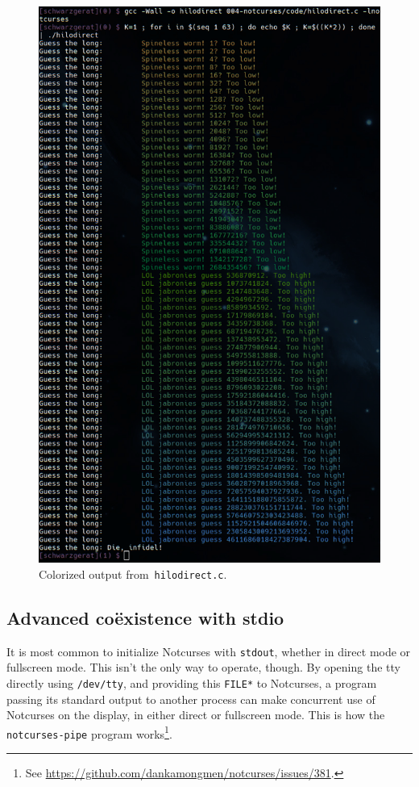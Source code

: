 \documentclass[letterpaper,10pt]{article}
\begin{document}
\begin{figure}[!htb]
\centering \includegraphics[width=.75\linewidth]{media/hilodirect.png}
\caption{Colorized output from~\texttt{hilodirect.c}.}
\label{fig:colorguess}
\end{figure}

\subsection{Advanced coëxistence with stdio}
It is most common to initialize Notcurses with \texttt{stdout}, whether in
direct mode or fullscreen mode. This isn't the only way to operate, though.
By opening the tty directly using \texttt{/dev/tty}\cite{tty4}, and providing
this \texttt{FILE*} to Notcurses, a program passing its standard output to
another process can make concurrent use of Notcurses on the display, in either
direct or fullscreen mode. This is how the \texttt{notcurses-pipe} program
works\footnote{See \url{https://github.com/dankamongmen/notcurses/issues/381}.}.
\end{document}
